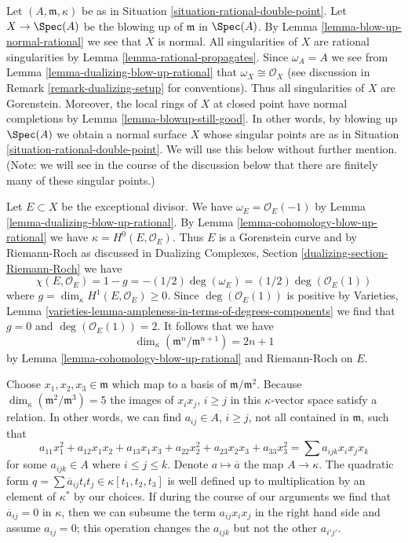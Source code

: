 \noindent
Let $(A, \mathfrak m, \kappa)$ be as in
Situation \ref{situation-rational-double-point}.
Let $X \to \Spec(A)$ be the blowing up of $\mathfrak m$ in $\Spec(A)$.
By Lemma \ref{lemma-blow-up-normal-rational} we see that $X$ is normal.
All singularities of $X$ are rational singularities
by Lemma \ref{lemma-rational-propagates}.
Since $\omega_A = A$ we see from Lemma \ref{lemma-dualizing-blow-up-rational}
that $\omega_X \cong \mathcal{O}_X$ (see discussion in
Remark \ref{remark-dualizing-setup} for conventions).
Thus all singularities of $X$ are Gorenstein.
Moreover, the local rings of $X$ at closed point have
normal completions by Lemma \ref{lemma-blowup-still-good}.
In other words, by blowing up $\Spec(A)$ we obtain a normal
surface $X$ whose singular points are as in
Situation \ref{situation-rational-double-point}.
We will use this below without further mention.
(Note: we will see in the course of the discussion below
that there are finitely many of these singular points.)

\medskip\noindent
Let $E \subset X$ be the exceptional divisor. We have
$\omega_E = \mathcal{O}_E(-1)$ by Lemma \ref{lemma-dualizing-blow-up-rational}.
By Lemma \ref{lemma-cohomology-blow-up-rational} we have
$\kappa = H^0(E, \mathcal{O}_E)$.
Thus $E$ is a Gorenstein curve and by Riemann-Roch as discussed in
Dualizing Complexes, Section \ref{dualizing-section-Riemann-Roch}
we have
$$
\chi(E, \mathcal{O}_E) = 1 - g = -(1/2) \deg(\omega_E) =
(1/2)\deg(\mathcal{O}_E(1))
$$
where $g = \dim_\kappa H^1(E, \mathcal{O}_E) \geq 0$.
Since $\deg(\mathcal{O}_E(1))$ is positive
by Varieties, Lemma
\ref{varieties-lemma-ampleness-in-terms-of-degrees-components}
we find that $g = 0$ and $\deg(\mathcal{O}_E(1)) = 2$. It follows that
we have
$$
\dim_\kappa (\mathfrak m^n/\mathfrak m^{n + 1}) = 2n + 1
$$
by Lemma \ref{lemma-cohomology-blow-up-rational} and Riemann-Roch
on $E$.

\medskip\noindent
Choose $x_1, x_2, x_3 \in \mathfrak m$ which map to a basis of
$\mathfrak m/\mathfrak m^2$. Because
$\dim_\kappa(\mathfrak m^2/\mathfrak m^3) = 5$
the images of $x_i x_j$, $i \geq j$ in this $\kappa$-vector space
satisfy a relation. In other words, we can find $a_{ij} \in A$,
$i \geq j$, not all contained in $\mathfrak m$, such that
$$
a_{11} x_1^2 + a_{12} x_1x_2 + a_{13}x_1x_3 + a_{22} x_2^2 +
a_{23} x_2x_3 + a_{33} x_3^2 =
\sum a_{ijk} x_ix_jx_k
$$
for some $a_{ijk} \in A$ where $i \leq j \leq k$. Denote
$a \mapsto \overline{a}$ the map $A \to \kappa$.
The quadratic form
$q = \sum \overline{a}_{ij} t_i t_j \in \kappa[t_1, t_2, t_3]$
is well defined up to multiplication by an element of $\kappa^*$
by our choices. If during the course of our arguments we find
that $\overline{a}_{ij} = 0$ in $\kappa$,
then we can subsume the term $a_{ij} x_i x_j$ in the right
hand side and assume $a_{ij} = 0$; this operation changes the $a_{ijk}$
but not the other $a_{i'j'}$.

